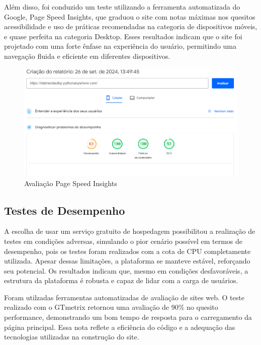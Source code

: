 Além disso, foi conduzido um teste utilizando a ferramenta automatizada do Google, Page Speed Insights, que graduou o site com notas máximas nos quesitos acessibilidade e uso de práticas recomendadas na categoria de dispositivos móveis, e quase perfeita na categoria Desktop. Esses resultados indicam que o site foi projetado com uma forte ênfase na experiência do usuário, permitindo uma navegação fluida e eficiente em diferentes dispositivos.

\begin{figure}[htb] \caption{\label{fig_grafico}Avaliação Page Speed Insights} \begin{center} \includegraphics[scale=0.3]{./img/pagespeedinsights.png} \end{center}  \end{figure}

\subsection{Testes de Desempenho}

A escolha de usar um serviço gratuito de hospedagem possibilitou a realização de testes em condições adversas, simulando o pior cenário possível em termos de desempenho, pois os testes foram realizados com a cota de CPU completamente utilizada. Apesar dessas limitações, a plataforma se manteve estável, reforçando seu potencial. Os resultados indicam que, mesmo em condições desfavoráveis, a estrutura da plataforma é robusta e capaz de lidar com a carga de usuários.

Foram utilzadas ferramentas automatizadas de avaliação de sites web. O teste realizado com o GTmetrix retornou uma avaliação de 90\% no quesito performance, demonstrando um bom tempo de resposta para o carregamento da página principal. Essa nota reflete a eficiência do código e a adequação das tecnologias utilizadas na construção do site.

